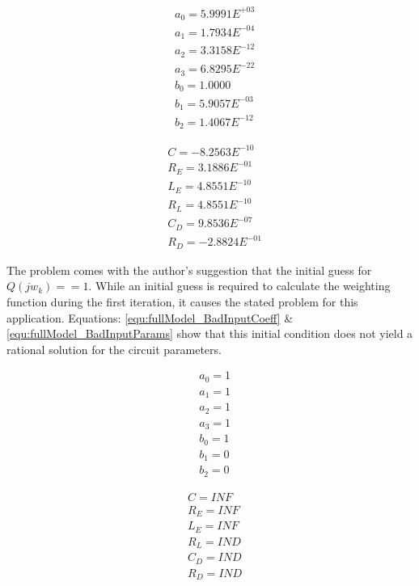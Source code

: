 \begin{multicols}{2}
\begin{equation}
\label{equ:fullModel_BadOutputCoeff}
\begin{split}
&a_0 = 5.9991E^{+03} \\
&a_1 = 1.7934E^{-04} \\
&a_2 = 3.3158E^{-12} \\
&a_3 = 6.8295E^{-22} \\
&b_0 = 1.0000        \\
&b_1 = 5.9057E^{-03} \\
&b_2 = 1.4067E^{-12}
\end{split}
\end{equation}

\begin{equation}
\label{equ:fullModel_BadOutputParams}
\begin{split}
&C   = -8.2563E^{-10} \\
&R_E =  3.1886E^{-01} \\
&L_E =  4.8551E^{-10} \\
&R_L =  4.8551E^{-10} \\
&C_D =  9.8536E^{-07} \\
&R_D = -2.8824E^{-01}
\end{split}
\end{equation}
\end{multicols}

The problem comes with the author's \cite{levy_iter} suggestion that the initial guess for $Q(jw_k) == 1$. While an initial guess is required to calculate the weighting function during the first iteration, it causes the stated problem for this application. Equations: \eqref{equ:fullModel_BadInputCoeff} \& \eqref{equ:fullModel_BadInputParams} show that this initial condition does not yield a rational solution for the circuit parameters.

\begin{multicols}{2}
\begin{equation}
\label{equ:fullModel_BadInputCoeff}
\begin{split}
&a_0 = 1 \\
&a_1 = 1 \\
&a_2 = 1 \\
&a_3 = 1 \\
&b_0 = 1 \\
&b_1 = 0 \\
&b_2 = 0
\end{split}
\end{equation}

\begin{equation}
\label{equ:fullModel_BadInputParams}
\begin{split}
&C   = INF \\
&R_E = INF \\
&L_E = INF \\
&R_L = IND \\
&C_D = IND \\
&R_D = IND \\
\end{split}
\end{equation}
\end{multicols}

